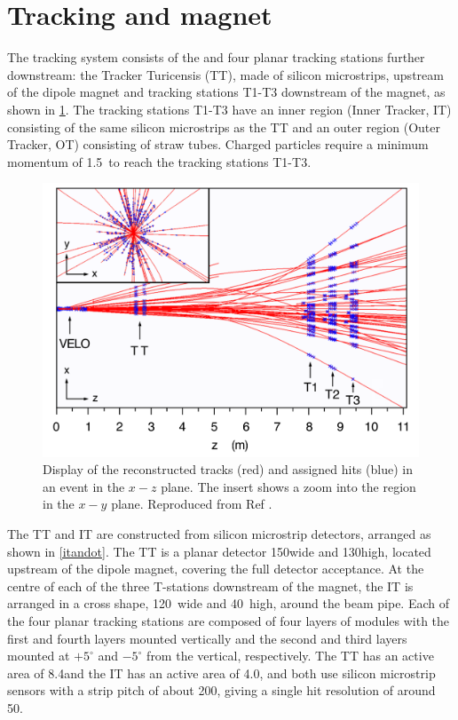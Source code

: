 \section{Tracking and magnet}
\label{sec:detector:tracking}

The \lhcb tracking system consists of the \velo and four planar tracking stations further downstream: the Tracker Turicensis (TT), made of silicon microstrips, upstream of the dipole magnet and tracking stations T1-T3 downstream of the magnet, as shown in \fig\ref{tracking}. The tracking stations T1-T3 have an inner region (Inner Tracker, IT) consisting of the same silicon microstrips as the TT and an outer region (Outer Tracker, OT) consisting of straw tubes. Charged particles require a minimum momentum of 1.5~\gevc to reach the tracking stations T1-T3.

\begin{figure}
\centering
\includegraphics[width=0.7\linewidth]{figures/detector/tracking.pdf}
\caption{Display of the reconstructed tracks (red) and assigned hits (blue) in an event in the $x-z$ plane. The insert shows a zoom into the \velo region in the $x-y$ plane. Reproduced from Ref \cite{LHCb-DP-2014-002}.}
\label{tracking}
\end{figure}

The TT and IT are constructed from silicon microstrip detectors, arranged as shown in \fig\ref{itandot}. The TT is a planar detector 150\cm wide and 130\cm high, located upstream of the dipole magnet, covering the full detector acceptance. At the centre of each of the three T-stations downstream of the magnet, the IT is arranged in a cross shape, 120~\cm wide and 40~\cm high, around the beam pipe. Each of the four planar tracking stations are composed of four layers of modules with the first and fourth layers mounted vertically and the second and third layers mounted at $+5^{\circ}$ and $-5^{\circ}$ from the vertical, respectively. The TT has an active area of 8.4\ma and the IT has an active area of 4.0\ma, and both use silicon microstrip sensors with a strip pitch of about
200\mum, giving a single hit resolution of around 50\mum.

